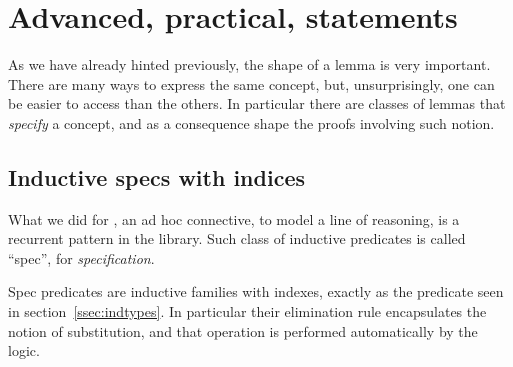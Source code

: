 





\section{Advanced, practical, statements}

As we have already hinted previously, the shape of a lemma is very important.
There are many ways to express the same concept, but, unsurprisingly,
one can be easier to access than the others.  In particular there are classes of
lemmas that \emph{specify} a concept, and as a consequence shape the proofs
involving such notion.


\subsection{Inductive specs with indices}\label{ssec:specs}
What we did for , an ad hoc connective, to model a line of reasoning, is
a recurrent pattern in the \mcbMC{} library.  Such class of inductive
predicates is called ``spec'', for \emph{specification}.

Spec predicates are inductive families with indexes, exactly
as the  predicate seen in section~\ref{ssec:indtypes}.
In particular their elimination rule encapsulates the notion
of substitution, and that operation is performed automatically by
the logic.

